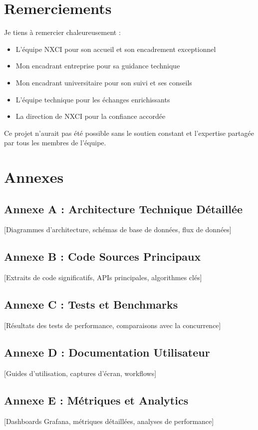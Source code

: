 \documentclass[a4paper,12pt]{article}
\begin{document}
\section*{Remerciements}

Je tiens à remercier chaleureusement :

\begin{itemize}
    \item L'équipe NXCI pour son accueil et son encadrement exceptionnel
    \item Mon encadrant entreprise pour sa guidance technique
    \item Mon encadrant universitaire pour son suivi et ses conseils
    \item L'équipe technique pour les échanges enrichissants
    \item La direction de NXCI pour la confiance accordée
\end{itemize}

Ce projet n'aurait pas été possible sans le soutien constant et l'expertise partagée par tous les membres de l'équipe.

\section*{Annexes}

\subsection*{Annexe A : Architecture Technique Détaillée}
[Diagrammes d'architecture, schémas de base de données, flux de données]

\subsection*{Annexe B : Code Sources Principaux}
[Extraits de code significatifs, APIs principales, algorithmes clés]

\subsection*{Annexe C : Tests et Benchmarks}
[Résultats des tests de performance, comparaisons avec la concurrence]

\subsection*{Annexe D : Documentation Utilisateur}
[Guides d'utilisation, captures d'écran, workflows]

\subsection*{Annexe E : Métriques et Analytics}
[Dashboards Grafana, métriques détaillées, analyses de performance]
\end{document}
